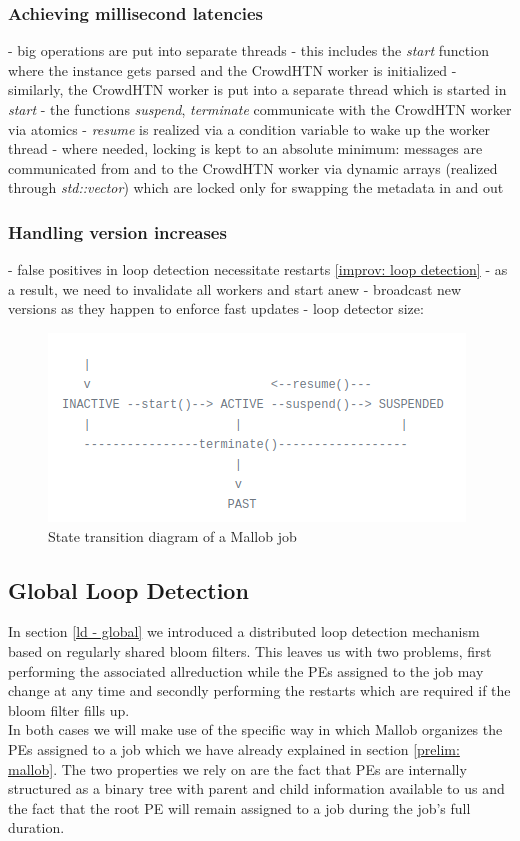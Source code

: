 \subsubsection{Achieving millisecond latencies}
- big operations are put into separate threads
- this includes the \textit{start} function where the instance gets parsed and the CrowdHTN worker is initialized
- similarly, the CrowdHTN worker is put into a separate thread which is started in \textit{start}
- the functions \textit{suspend}, \textit{terminate} communicate with the CrowdHTN worker via atomics
- \textit{resume} is realized via a condition variable to wake up the worker thread
- where needed, locking is kept to an absolute minimum: messages are communicated from and to the CrowdHTN worker via dynamic arrays (realized through \textit{std::vector}) which are locked only for swapping the metadata in and out

\subsubsection{Handling version increases}
- false positives in loop detection necessitate restarts \ref{improv: loop detection}
- as a result, we need to invalidate all workers and start anew
- broadcast new versions as they happen to enforce fast updates
- loop detector size:

\begin{figure}
	\caption{State transition diagram of a Mallob job}
	\label{figure: mallob state diagram}
	\centering
	\includegraphics{images/prelim/mallob_state_diagram}
\end{figure}

\subsection{Global Loop Detection}
In section \ref{ld - global} we introduced a distributed loop detection mechanism based on regularly shared bloom filters. This leaves us with two problems, first performing the associated allreduction while the PEs assigned to the job may change at any time and secondly performing the restarts which are required if the bloom filter fills up. \\
In both cases we will make use of the specific way in which Mallob organizes the PEs assigned to a job which we have already explained in section \ref{prelim: mallob}. The two properties we rely on are the fact that PEs are internally structured as a binary tree with parent and child information available to us and the fact that the root PE will remain assigned to a job during the job's full duration.

